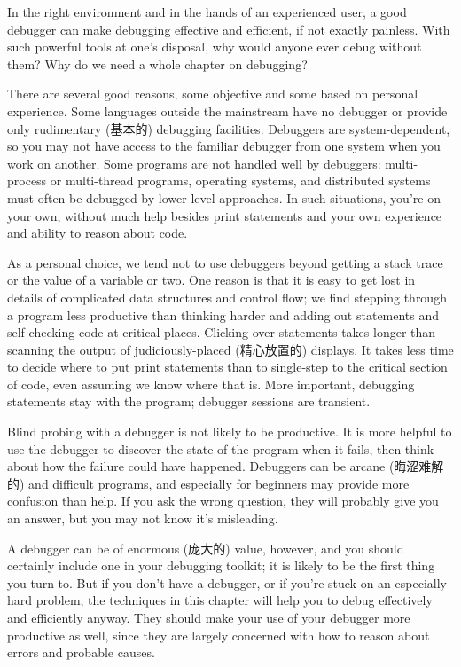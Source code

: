 In the right environment and in the hands of an experienced user, a good
debugger can make debugging effective and efficient, if not exactly
painless. With such powerful tools at one's disposal, why would anyone ever
debug without them? Why do we need a whole chapter on debugging?

There are several good reasons, some objective and some based on personal
experience. Some languages outside the mainstream have no debugger or
provide only rudimentary (基本的) debugging facilities. Debuggers are
system-dependent, so you may not have access to the familiar debugger from
one system when you work on another. Some programs are not handled well by
debuggers: multi-process or multi-thread programs, operating systems, and
distributed systems must often be debugged by lower-level approaches. In
such situations, you're on your own, without much help besides print
statements and your own experience and ability to reason about code.

As a personal choice, we tend not to use debuggers beyond getting a stack
trace or the value of a variable or two. One reason is that it is easy to
get lost in details of complicated data structures and control flow; we
find stepping through a program less productive than thinking harder and
adding out statements and self-checking code at critical places. Clicking
over statements takes longer than scanning the output of judiciously-placed
(精心放置的) displays. It takes less time to decide where to put print
statements than to single-step to the critical section of code, even
assuming we know where that is. More important, debugging statements stay
with the program; debugger sessions are transient.

Blind probing with a debugger is not likely to be productive. It is more
helpful to use the debugger to discover the state of the program when it
fails, then think about how the failure could have happened. Debuggers can
be arcane (晦涩难解的) and difficult programs, and especially for beginners
may provide more confusion than help. If you ask the wrong question, they
will probably give you an answer, but you may not know it's misleading.

A debugger can be of enormous (庞大的) value, however, and you should
certainly include one in your debugging toolkit; it is likely to be the
first thing you turn to. But if you don't have a debugger, or if you're
stuck on an especially hard problem, the techniques in this chapter will
help you to debug effectively and efficiently anyway. They should make your
use of your debugger more productive as well, since they are largely
concerned with how to reason about errors and probable causes.

